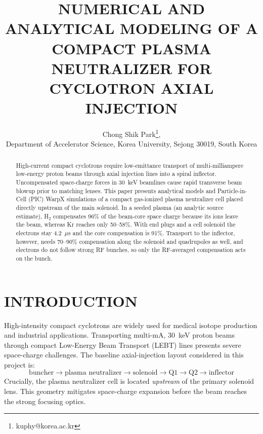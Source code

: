 \documentclass[banner]{jacow}
\begin{document}
\title{NUMERICAL AND ANALYTICAL MODELING OF A COMPACT PLASMA NEUTRALIZER FOR CYCLOTRON AXIAL INJECTION}

\author{Chong Shik Park\thanks{kuphy@korea.ac.kr},\\
Department of Accelerator Science, Korea University, Sejong 30019, South Korea}

\maketitle

\begin{abstract}
High-current compact cyclotrons require low-emittance transport of multi-milliampere low-energy proton beams through axial injection lines into a spiral inflector. Uncompensated space-charge forces in 30~keV beamlines cause rapid transverse beam blowup prior to matching lenses. This paper presents analytical models and Particle-in-Cell (PIC) WarpX simulations of a compact gas-ionized plasma neutralizer cell placed directly upstream of the main solenoid. In a seeded plasma (an analytic source estimate), H$_2$ compensates 96\% of the beam-core space charge because its ions leave the beam, whereas Kr reaches only 50--58\%. With end plugs and a cell solenoid the electrons stay 4.2~$\mu$s and the core compensation is 91\%. Transport to the inflector, however, needs 70--90\% compensation along the solenoid and quadrupoles as well, and electrons do not follow strong RF bunches, so only the RF-averaged compensation acts on the bunch.
\end{abstract}

\section{INTRODUCTION}

High-intensity compact cyclotrons are widely used for medical isotope production and industrial applications. Transporting multi-mA, 30~keV proton beams through compact Low-Energy Beam Transport (LEBT) lines presents severe space-charge challenges. The baseline axial-injection layout considered in this project is:
\begin{equation}
\text{buncher} \rightarrow \text{plasma neutralizer} \rightarrow \text{solenoid} \rightarrow \text{Q1} \rightarrow \text{Q2} \rightarrow \text{inflector}
\end{equation}
Crucially, the plasma neutralizer cell is located \emph{upstream} of the primary solenoid lens. This geometry mitigates space-charge expansion before the beam reaches the strong focusing optics.
\end{document}

